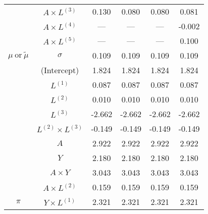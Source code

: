 \begin{sidewaystable}
\begin{minipage}[t]{0.5\textwidth}
\begin{tabular}[t]{>{}ccccc>{}c}
\cmidrule{2-6}
 & $A \times L^{(3)}$ & 0.130 & 0.080 & 0.080 & 0.081\\
\cmidrule{2-6}
 & $A \times L^{(4)}$ & --- & --- & --- & -0.002\\
\cmidrule{2-6}
 & $A \times L^{(5)}$ & --- & --- & --- & 0.100\\
\cmidrule{2-6}
\multirow{-15}{*}{\centering\arraybackslash $\mu~\text{or}~\tilde\mu$} & $\sigma$ & 0.109 & 0.109 & 0.109 & 0.109\\
\cmidrule{1-6}
 & (Intercept) & 1.824 & 1.824 & 1.824 & 1.824\\
\cmidrule{2-6}
 & $L^{(1)}$ & 0.087 & 0.087 & 0.087 & 0.087\\
\cmidrule{2-6}
 & $L^{(2)}$ & 0.010 & 0.010 & 0.010 & 0.010\\
\cmidrule{2-6}
 & $L^{(3)}$ & -2.662 & -2.662 & -2.662 & -2.662\\
\cmidrule{2-6}
 & $L^{(2)} \times L^{(3)}$ & -0.149 & -0.149 & -0.149 & -0.149\\
\cmidrule{2-6}
 & $A$ & 2.922 & 2.922 & 2.922 & 2.922\\
\cmidrule{2-6}
 & $Y$ & 2.180 & 2.180 & 2.180 & 2.180\\
\cmidrule{2-6}
 & $A\times Y$ & 3.043 & 3.043 & 3.043 & 3.043\\
\cmidrule{2-6}
 & $A \times L^{(2)}$ & 0.159 & 0.159 & 0.159 & 0.159\\
\cmidrule{2-6}
\multirow{-10}{*}{\centering\arraybackslash $\pi$} & $Y \times L^{(1)}$ & 2.321 & 2.321 & 2.321 & 2.321\\
\hline
\end{tabular}
\end{minipage}
\begin{minipage}[t]{0.5\textwidth}


\end{minipage}
\end{sidewaystable}
